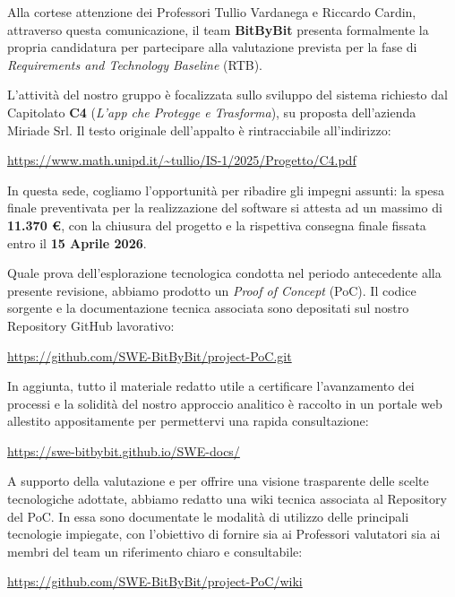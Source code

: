 \documentclass[a4paper,12pt]{article}
\begin{document}
\begin{flushleft}
Alla cortese attenzione dei Professori Tullio Vardanega e Riccardo Cardin,\\[0.3cm]
attraverso questa comunicazione, il team \textbf{BitByBit} presenta formalmente la propria candidatura per partecipare alla valutazione prevista per la fase di \textit{Requirements and Technology Baseline} (RTB).

L'attività del nostro gruppo è focalizzata sullo sviluppo del sistema richiesto dal Capitolato \textbf{C4} (\textit{L'app che Protegge e Trasforma}), su proposta dell'azienda Miriade Srl. Il testo originale dell'appalto è rintracciabile all'indirizzo:
\begin{center}
    \url{https://www.math.unipd.it/~tullio/IS-1/2025/Progetto/C4.pdf}
\end{center}

In questa sede, cogliamo l'opportunità per ribadire gli impegni assunti: la spesa finale preventivata per la realizzazione del software si attesta ad un massimo di \textbf{11.370 \euro}, con la chiusura del progetto e la rispettiva consegna finale fissata entro il \textbf{15 Aprile 2026}.

Quale prova dell'esplorazione tecnologica condotta nel periodo antecedente alla presente revisione, abbiamo prodotto un \textit{Proof of Concept} (PoC). Il codice sorgente e la documentazione tecnica associata sono depositati sul nostro Repository GitHub lavorativo:
\begin{center}
    \url{https://github.com/SWE-BitByBit/project-PoC.git}
\end{center}

In aggiunta, tutto il materiale redatto utile a certificare l'avanzamento dei processi e la solidità del nostro approccio analitico è raccolto in un portale web allestito appositamente per permettervi una rapida consultazione:
\begin{center}
    \url{https://swe-bitbybit.github.io/SWE-docs/}
\end{center}

A supporto della valutazione e per offrire una visione trasparente delle scelte tecnologiche adottate, abbiamo redatto una wiki tecnica associata al Repository del PoC. In essa sono documentate le modalità di utilizzo delle principali tecnologie impiegate, con l'obiettivo di fornire sia ai Professori valutatori sia ai membri del team un riferimento chiaro e consultabile:
\begin{center}
    \url{https://github.com/SWE-BitByBit/project-PoC/wiki}
\end{center}


\end{flushleft}
\end{document}
